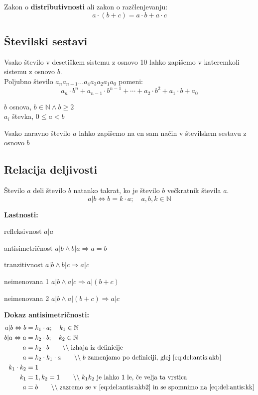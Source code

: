 \documentclass[a4paper,oneside,12pt,fleqn]{article}
\def\N{\ensuremath{\mathbb N}}
\newcommand\krat\cdot
\newcommand{\comment}[1]{\ensuremath{\qquad\backslash\backslash\;}\textnormal{#1}}
\renewcommand\implies\Rightarrow
\renewcommand\iff\Leftrightarrow
\numberwithin{equation}{section}
\newenvironment{xlist}[1][\rule{0.75 cm}{0cm}]{%
\vspace{-14pt}
  \begin{list}{}{%
    \settowidth{\labelwidth}{#1:}
    \setlength{\labelsep}{0.5cm}
    \setlength{\leftmargin}{\labelwidth}
    \addtolength{\leftmargin}{\labelsep}
    \addtolength{\leftmargin}{20pt}
    \setlength{\rightmargin}{0pt}
    \setlength{\parsep}{0.5ex plus 0.2ex minus 0.1ex}
    \setlength{\itemsep}{0 ex plus 0.2ex}
    \renewcommand{\makelabel}[1]{##1:\hfil}
    }
  }
{\end{list}}
\begin{document}
Zakon o \textbf{distributivnosti} ali zakon o razčlenjevanju:
\[ a \krat (b + c) = a \krat b + a \krat c \]


\subsection{Številski sestavi}
Vsako število v desetiškem sistemu z osnovo 10 lahko zapišemo v kateremkoli sistemu
z osnovo $b$. \\
Poljubno število $a_na_{n-1}\!\ldots a_4a_3a_2a_1a_0$ pomeni:
\[ a_n \krat b^n + a_{n-1} \krat b^{n-1} + \cdots + a_2 \krat b^2 +a_1 \krat b + a_0 \]

$b$ osnova, $b \in \N \land b \geq 2$ \\
$a_i$ števka, $0 \leq a < b$

Vsako naravno število $a$ lahko zapišemo na en sam način v številskem sestavu z osnovo $b$

\subsection{Relacija deljivosti}
Število $a$ deli število $b$ natanko takrat, ko je število $b$ večkratnik števila $a$.
\[ a | b \iff b = k \krat a;\quad a, b, k \in \N \]

\textbf{Lastnosti:}
\begin{xlist}[Antisimetričnost]
  \item[refleksivnost]       $a|a$
  \item[antisimetričnost]  $a|b \land b|a \implies a = b$
  \item[tranzitivnost]      $a|b \land b|c \implies a|c$
  \item[neimenovana 1]      $a|b \land a|c \implies a|\left( b+c \right)$
  \item[neimenovana 2]      $a|b \land a|\left( b+c \right) \implies a|c$
\end{xlist}

\textbf{Dokaz antisimetričnosti:}
\begin{align}
  a|b \iff b &= k_1 \krat a; \quad k_1 \in \N \\
  b|a \iff a &= k_2 \krat b; \quad k_2 \in \N \label{eq:del:antis:akb} \\
  a &= k_2 \krat b \comment{izhaja iz definicije} \label{eq:del:antis:akb2} \\
  a &= k_2 \krat k_1 \krat a \comment{$b$ zamenjamo po definiciji, glej \eqref{eq:del:antis:akb}} \\
  k_1 \krat k_2 &= 1 \\
  k_1 &= 1, k_2 = 1 \label{eq:del:antis:kk} \comment{$k_1k_2$ je lahko 1 le, če velja ta
  vrstica} \\
  a &= b \comment{zazremo se v \eqref{eq:del:antis:akb2} in se spomnimo na \eqref{eq:del:antis:kk}}
\end{align}
\end{document}
